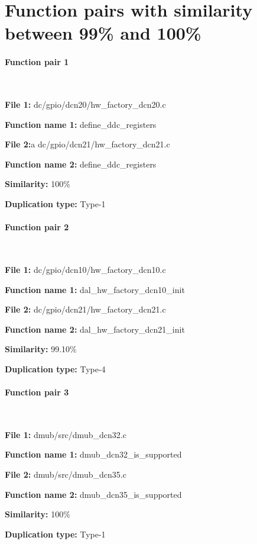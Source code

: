 \section{Function pairs with similarity between 99\% and 100\%}

\paragraph{Function pair 1 }  

\

\textbf{File 1:} dc/gpio/dcn20/hw\_factory\_dcn20.c

\textbf{Function name 1:} define\_ddc\_registers

\textbf{File 2:}a dc/gpio/dcn21/hw\_factory\_dcn21.c

\textbf{Function name 2:} define\_ddc\_registers

\textbf{Similarity:} 100\%

\textbf{Duplication type:} Type-1


\paragraph{Function pair 2 }  

\

\textbf{File 1:} dc/gpio/dcn10/hw\_factory\_dcn10.c

\textbf{Function name 1:} dal\_hw\_factory\_dcn10\_init

\textbf{File 2:} dc/gpio/dcn21/hw\_factory\_dcn21.c

\textbf{Function name 2:} dal\_hw\_factory\_dcn21\_init

\textbf{Similarity:} 99.10\%

\textbf{Duplication type:} Type-4

\paragraph{Function pair 3 }  

\

\textbf{File 1:} dmub/src/dmub\_dcn32.c

\textbf{Function name 1:} dmub\_dcn32\_is\_supported

\textbf{File 2:} dmub/src/dmub\_dcn35.c

\textbf{Function name 2:} dmub\_dcn35\_is\_supported

\textbf{Similarity:} 100\%

\textbf{Duplication type:} Type-1


